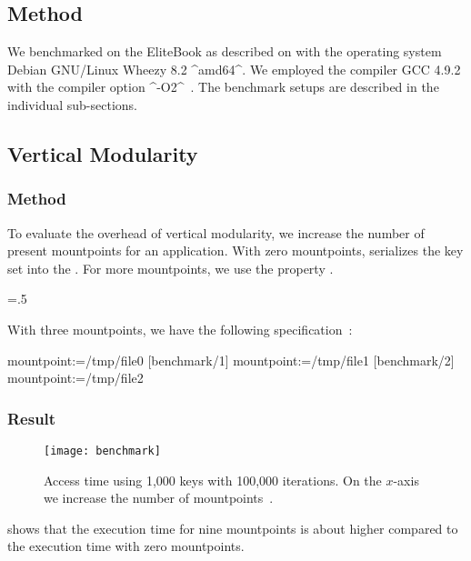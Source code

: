\subsection{Method}

We benchmarked  on the EliteBook as described on  with the operating system Debian GNU/Linux Wheezy 8.2 ^amd64^.
We employed the compiler GCC \mbox{4.9.2} with the compiler option ^-O2^~\cite{raab2016improving}.
The benchmark setups are described in the individual sub-sections.


\subsection{Vertical Modularity}

\subsubsection{Method}

To evaluate the overhead of vertical modularity, we increase the number of present mountpoints for an application.
With zero mountpoints, \elektra{} serializes the key set into the .
For more mountpoints, we use the property .%
{\parfillskip=0pt \emergencystretch=.5\textwidth \par}
\begin{example}
With three mountpoints, we have the following specification~\cite{raab2016improving}:

\begin{code}
[benchmark/0]
  mountpoint:=/tmp/file0
[benchmark/1]
  mountpoint:=/tmp/file1
[benchmark/2]
  mountpoint:=/tmp/file2
\end{code}
\end{example}

\subsubsection{Result}

\begin{figure}[htp]
\texttt{[image: benchmark]}
\caption[Access Time with increasing number of mountpoints.]{Access time using 1,000 keys with 100,000 iterations.
On the $x$-axis we increase the number of mountpoints~\cite{raab2016improving}.}
\label{fig:benchmark-access}
\end{figure}

 shows that the execution time for nine mountpoints is about  higher compared to the execution time with zero mountpoints.


